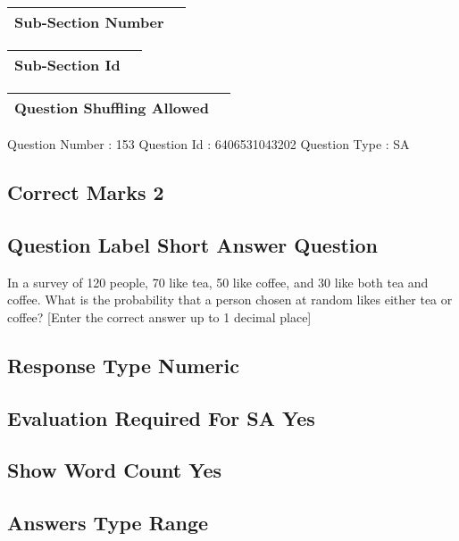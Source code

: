 \documentclass{article}
\begin{document}
\begin{longtable}{|c|c|}
\hline
\textbf{Sub-Section Number} & \textbf{} \\ \hline
\end{longtable}

\begin{longtable}{|c|c|}
\hline
\textbf{Sub-Section Id} & \textbf{} \\ \hline
\end{longtable}

\begin{longtable}{|c|c|}
\hline
\textbf{Question Shuffling Allowed} & \textbf{} \\ \hline
\end{longtable}

Question Number : 153 Question Id : 6406531043202 Question Type : SA\\

\subsection{Correct Marks  2}

\subsection{Question Label  Short Answer Question}

In a survey of 120 people, 70 like tea, 50 like coffee, and 30 like both tea and coffee. What is the 
probability that a person chosen at random likes either tea or coffee? [Enter the correct answer up 
to 1 decimal place]\\

\subsection{Response Type  Numeric}

\subsection{Evaluation Required For SA  Yes}

\subsection{Show Word Count  Yes}

\subsection{Answers Type  Range}
\end{document}
